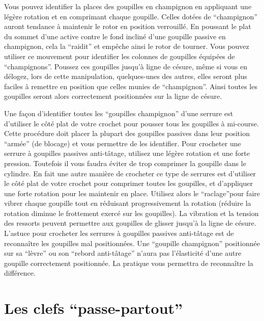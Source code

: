 \documentclass[a4paper,french,11pt,twoside]{report}
\begin{document}
Vous pouvez identifier la places des goupilles en champignon en appliquant une légère rotation et en comprimant chaque goupille. Celles dotées de \enquote{champignon} auront tendance à maintenir le rotor en position verrouillé. En poussant le plat du sommet d'une active contre le fond incliné d'une goupille passive en champignon, cela la \enquote{raidit} et empêche ainsi le rotor de tourner. Vous pouvez utiliser ce mouvement pour identifier les colonnes de goupilles équipées de \enquote{champignons}. Poussez ces goupilles jusqu'à ligne de césure, même si vous en délogez, lors de cette manipulation, quelques-unes des autres, elles seront plus faciles à remettre en position que celles munies de \enquote{champignon}. Ainsi toutes les goupilles seront alors correctement positionnées sur la ligne de césure.

Une façon d'identifier toutes les \enquote{goupilles champignon} d'une serrure est d'utiliser le côté plat de votre crochet pour pousser tous les goupilles à mi-course. Cette procédure doit placer la plupart des goupilles passives dans leur position \enquote{armée} (de blocage) et vous permettre de les identifier.
Pour crocheter une serrure à goupilles passives anti-tâtage, utilisez une légère rotation et une forte pression. Toutefois il vous faudra éviter de trop comprimer la goupille dans le cylindre. En fait une autre manière de crocheter ce type de serrures est d'utiliser le côté plat de votre crochet pour comprimer toutes les goupilles, et d'appliquer une forte rotation pour les maintenir en place. Utilisez alors le \enquote{raclage}pour faire vibrer chaque goupille tout en réduisant progressivement la rotation (réduire la rotation diminue le frottement exercé sur les goupilles). La vibration et la tension des ressorts peuvent permettre aux goupilles de glisser jusqu'à la ligne de césure. L'astuce pour crocheter les serrures à goupilles passives anti-tâtage est de reconnaître les goupilles mal positionnées. Une \enquote{goupille champignon} positionnée sur sa \enquote{lèvre} ou son \enquote{rebord anti-tâtage} n'aura pas l'élasticité d'une autre goupille correctement positionnée. La pratique vous permettra de reconnaître la différence.

\section{Les clefs \enquote{passe-partout}}
\end{document}
